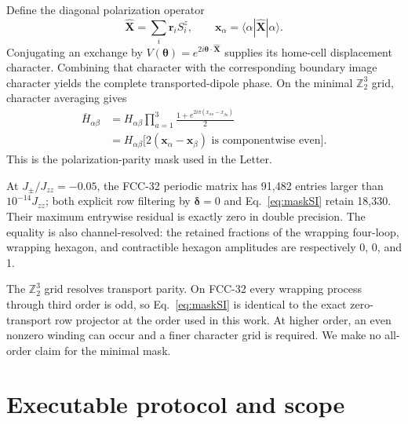 \documentclass[aps,prl,onecolumn,amsmath,amssymb,superscriptaddress]{revtex4-2}
\newcommand{\Jzz}{J_{zz}}
\newcommand{\Jpm}{J_{\pm}}
\newcommand{\br}{\bm r}
\newcommand{\bdelta}{\bm\delta}
\newcommand{\btheta}{\bm\theta}
\begin{document}
Define the diagonal polarization operator
\begin{equation}
 \hat{\bm X}=\sum_i\br_iS_i^z,\qquad
 \bm x_\alpha=\langle\alpha|\hat{\bm X}|\alpha\rangle.
\end{equation}
Conjugating an exchange by
$V(\btheta)=e^{2i\btheta\cdot\hat{\bm X}}$ supplies its home-cell
displacement character. Combining that character with the corresponding
boundary image character yields the complete transported-dipole phase. On
the minimal $\mathbb Z_2^3$ grid, character averaging gives
\begin{align}
 \overline H_{\alpha\beta}
 &=H_{\alpha\beta}\prod_{a=1}^{3}
 \frac{1+e^{2i\pi(x_{\alpha a}-x_{\beta a})}}{2}\\
 &=H_{\alpha\beta}
 \big[2(\bm x_\alpha-\bm x_\beta)
       \text{ is componentwise even}\big].
\label{eq:maskSI}
\end{align}
This is the polarization-parity mask used in the Letter.

At $\Jpm/\Jzz=-0.05$, the FCC-32 periodic matrix has 91,482 entries larger
than $10^{-14}\Jzz$; both explicit row filtering by $\bdelta=0$ and
Eq.~\eqref{eq:maskSI} retain 18,330. Their maximum entrywise residual is
exactly zero in double precision. The equality is also channel-resolved:
the retained fractions of the wrapping four-loop, wrapping hexagon, and
contractible hexagon amplitudes are respectively 0, 0, and 1.

The $\mathbb Z_2^3$ grid resolves transport parity. On FCC-32 every wrapping
process through third order is odd, so Eq.~\eqref{eq:maskSI} is identical to
the exact zero-transport row projector at the order used in this work. At
higher order, an even nonzero winding can occur and a finer character grid is
required. We make no all-order claim for the minimal mask.

\section{Executable protocol and scope}
\label{sec:protocol}
\end{document}
